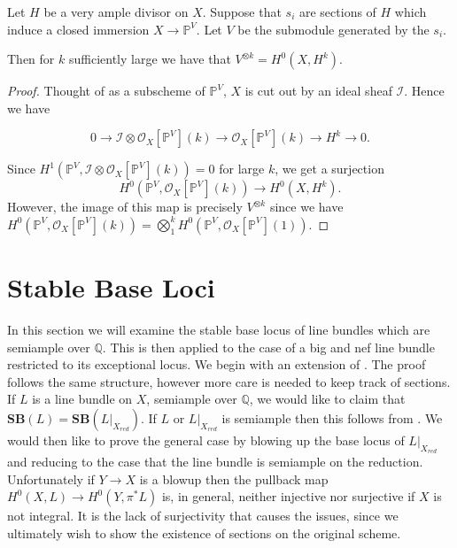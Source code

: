 \documentclass[a4paper,12pt]{book}
\newcommand{\SB}{\mathbf{SB}}
\newcommand{\ox}{\mathcal{O}_{X}}
\begin{document}
\begin{lemma}\label{ampall}
	
	Let $H$ be a very ample divisor on $X$. Suppose that $s_{i}$ are sections of $H$ which induce a closed immersion $X \to \mathbb{P}^{V}$. Let $V$ be the submodule generated by the $s_{i}$.
	
	Then for $k$ sufficiently large we have that $V^{\otimes k}=H^{0}(X,H^{k})$.
	
\end{lemma}

\begin{proof}
	
	Thought of as a subscheme of $\mathbb{P}^{V}$, $X$ is cut out by an ideal sheaf $\mathcal{I}$. Hence we have 
	
	\[0 \to \mathcal{I}\otimes \ox[\mathbb{P}^{V}](k) \to \ox[\mathbb{P}^{V}](k) \to H^{k} \to 0.\]
	
	Since $H^{1}(\mathbb{P}^{V}, \mathcal{I}\otimes \ox[\mathbb{P}^{V}](k))=0$ for large $k$, we get a surjection $$H^{0}(\mathbb{P}^{V},\ox[\mathbb{P}^{V}](k)) \to H^{0}(X,H^{k}).$$ However, the image of this map is precisely $V^{\otimes k}$ since we have $H^{0}(\mathbb{P}^{V},\ox[\mathbb{P}^{V}](k))=\bigotimes_{1}^{k}H^{0}(\mathbb{P}^{V},\ox[\mathbb{P}^{V}](1))$.
	
	
	
\end{proof}

\section{Stable Base Loci}

In this section we will examine the stable base locus of line bundles which are semiample over $\mathbb{Q}$. This is then applied to the case of a big and nef line bundle restricted to its exceptional locus.  We begin with an extension of \cite[Theorem 1.10]{witaszek2020keel}. The proof follows the same structure, however more care is needed to keep track of sections.\\

If $L$ is a line bundle on $X$, semiample over $\mathbb{Q}$, we would like to claim that $\SB(L)=\SB(L|_{X_{red}})$. If $L$ or $L|_{X_{red}}$ is semiample then this follows from \cite[Thereom 1.10]{witaszek2020keel}. We would then like to prove the general case by blowing up the base locus of $L|_{X_{red}}$ and reducing to the case that the line bundle is semiample on the reduction. Unfortunately if $Y \to X$ is a blowup then the pullback map $H^{0}(X,L) \to H^{0}(Y,\pi^{*}L)$ is, in general, neither injective nor surjective if $X$ is not integral. It is the lack of surjectivity that causes the issues, since we ultimately wish to show the existence of sections on the original scheme.\\ 
\end{document}
